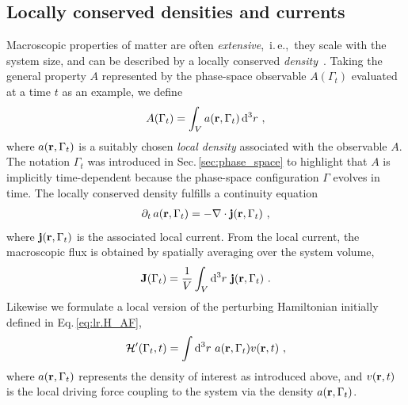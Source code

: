 \subsection{Locally conserved densities and currents}
Macroscopic properties of matter are often \emph{extensive},~i.\,e.,~they scale with the system size, and can be described by a locally conserved \emph{density}~\cite{Baroni2020a}. Taking the general property $A$ represented by the phase-space observable $A(\Gamma_t)$ evaluated at a time $t$ as an example, we define
\begin{align}
  A (\Gamma_t) = \int_V a (\b r, \Gamma_t) \, \d^3 r~,
  \label{eq:lr.A}
\end{align}
where $a({\bf r}, \Gamma_t)$ is a suitably chosen \emph{local density} associated with the observable $A$. The notation $\Gamma_t$ was introduced in Sec.\,\ref{sec:phase_space} to highlight that $A$ is implicitly time-dependent because the phase-space configuration $\Gamma$ evolves in time.
The locally conserved density fulfills a continuity equation
\begin{align}
  \partial_t \, a(\b r, \Gamma_t) = - \b \nabla \cdot \b j (\b r, \Gamma_t)~,
  \label{eq:lr.continuity.1}
\end{align}
where ${\bf j} ({\bf r}, \Gamma_t)$ is the associated local current. From the local current, the macroscopic flux is obtained by spatially averaging over the system volume,
\begin{align}
  \b J (\Gamma_t)
    = \frac{1}{V} \int_V \d^3 r ~ \b j (\b r, \Gamma_t)~.
  \label{eq:lr.J(t)}
\end{align}
Likewise we formulate a local version of the perturbing Hamiltonian initially defined in Eq.\,\eqref{eq:lr.H_AF},
\begin{align}
	\mathcal H' (\Gamma_t, t) = \int \d^3 r ~ a (\b r, \Gamma_t) v(\b r, t)~,
	\label{eq:lr.H'}
\end{align}
where $a({\bf r}, \Gamma_t)$ represents the density of interest as introduced above, and $v({\bf r}, t)$ is the local driving force coupling to the system via the density $a ({\bf r}, \Gamma_t)$.

